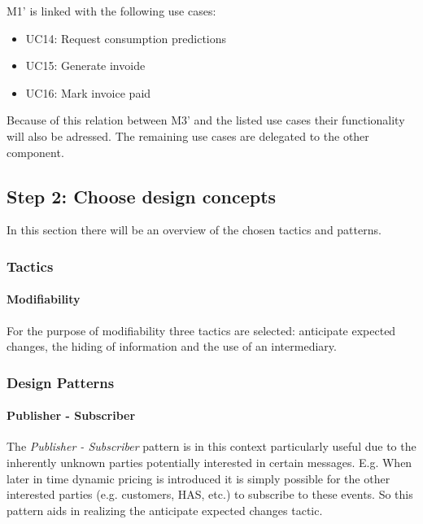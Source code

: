 \npar M1' is linked with the following use cases:

\begin{itemize}
  \item UC14: Request consumption predictions
  \item UC15: Generate invoide
  \item UC16: Mark invoice paid
\end{itemize}

\npar Because of this relation between M3' and the listed use cases their
functionality will also be adressed. The remaining use cases are delegated to
the other component. %

\subsection{Step 2: Choose design concepts}
\label{add:it10/concepts}

\npar In this section there will be an overview of the chosen tactics and
patterns.

\subsubsection{Tactics}
\label{add:it10/tactics}

\paragraph{Modifiability}

\npar For the purpose of modifiability three tactics are selected: anticipate
expected changes, the hiding of information and the use of an intermediary.

\subsubsection{Design Patterns}
\label{add:it10/patterns}

\paragraph{Publisher - Subscriber}

\npar The \emph{Publisher - Subscriber} pattern is in this context particularly useful due to
the inherently unknown parties potentially interested in certain messages. E.g. When
later in time dynamic pricing is introduced it is simply possible for the other
interested parties (e.g. customers, HAS, etc.) to subscribe to these events. So
this pattern aids in realizing the anticipate expected changes tactic.

